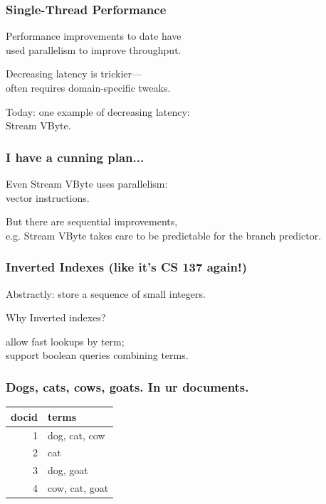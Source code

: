 \begin{frame}
\frametitle{Single-Thread Performance}


Performance improvements to date have \\
used parallelism
to improve throughput. 

Decreasing latency is trickier---\\
often requires domain-specific
tweaks. 

Today: one example of decreasing latency: \\
\hspace*{2em} Stream VByte.


\end{frame}


\begin{frame}
\frametitle{I have a cunning plan...}



Even Stream VByte uses parallelism:\\
\hspace*{2em}vector instructions. 

But there
are sequential improvements, \\
e.g. Stream VByte takes care to be predictable
for the branch predictor.


\end{frame}
\begin{frame}
\frametitle{Inverted Indexes (like it's CS 137 again!)}



\vspace*{-1em}
Abstractly: store a sequence of small integers.


Why Inverted indexes?

\hspace*{1cm}allow fast lookups by term;\\
\hspace*{1cm}support boolean queries combining terms.



\end{frame}
\begin{frame}
\frametitle{Dogs, cats, cows, goats. In ur documents.}


\begin{center}
\begin{tabular}{r|l}
docid & terms \\ \hline
1 & dog, cat, cow\\
2 & cat\\
3 & dog, goat\\
4 & cow, cat, goat\\
\end{tabular}
\end{center}


\end{frame}


